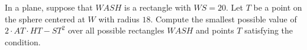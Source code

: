 In a plane, suppose that $WASH$ is a rectangle with $WS=20$. Let $T$ be a point on the sphere centered at $W$ with radius $18$. Compute the smallest possible value of $2\cdot AT\cdot HT-ST^2$ over all possible rectangles $WASH$ and points $T$ satisfying the condition.